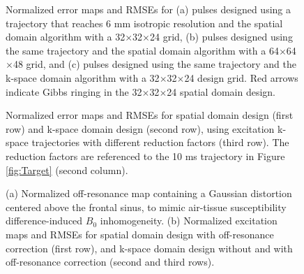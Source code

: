\documentclass[11pt]{article}
\begin{document}
\begin{figure}
	\centering
	\caption{Normalized error maps and RMSEs for 
	(a) pulses designed using a trajectory that reaches 6 mm isotropic resolution
	and the spatial domain algorithm with a 32$\times$32$\times$24 grid, 
	(b) pulses designed using the same trajectory and the spatial domain algorithm with a 64$\times$64$\times$48 grid,  
	and (c) pulses designed using the same trajectory and the k-space domain algorithm with a 32$\times$32$\times$24 design grid. 
	Red arrows indicate Gibbs ringing in the 32$\times$32$\times$24 spatial domain design.}
	\label{fig:GibbsRing}
\end{figure}


\begin{figure}
	\centering
	\caption{Normalized error maps and RMSEs for spatial domain design (first row) and k-space domain design (second row), 
	using excitation k-space trajectories with different reduction factors (third row).
	The reduction factors are referenced to the 10 ms trajectory in Figure \ref{fig:Target} (second column).}
	\label{fig:kspace_PTX_Acceleration}
\end{figure}


\begin{figure}
	\centering
	\caption{
	(a) Normalized off-resonance map containing a Gaussian distortion centered above the frontal sinus, 
	to mimic air-tissue susceptibility difference-induced $B_0$ inhomogeneity.
	(b) Normalized excitation maps and RMSEs for spatial domain design with off-resonance correction (first row), 
	and k-space domain design without and with off-resonance correction (second and third rows).}
	\label{fig:kspace_PTX_B0}
\end{figure}
\end{document}

